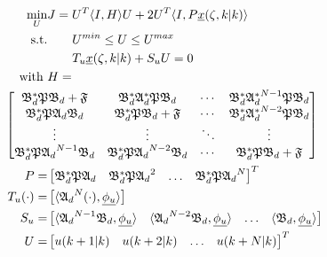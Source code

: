 \begin{equation} \label{eq:MPC_QP}
    \begin{aligned}
        \min_{U} &J = U^T \langle I,H \rangle U + 2U^T \langle I, P \underline{x}(\zeta, k|k) \rangle \\
        \text{s.t.} &\qquad U^{min} \leq U \leq U^{max} \\
        &\qquad T_u \underline{x}(\zeta, k|k) + S_u U = 0
        \, \\
        \text{with } &H = \\
        &\hspace{-3.5em }\begin{bmatrix}
            \mathfrak{B}_d^* \mathfrak{P} \mathfrak{B}_d + \mathfrak{F} & \mathfrak{B}_d^* \mathfrak{A}_d^* \mathfrak{P} \mathfrak{B}_d & \cdots &  \mathfrak{B}_d^* {\mathfrak{A}_d^*}^{N-1} \mathfrak{P} \mathfrak{B}_d \\
            \mathfrak{B}_d^* \mathfrak{P} \mathfrak{A}_d \mathfrak{B}_d & \mathfrak{B}_d^* \mathfrak{P} \mathfrak{B}_d + \mathfrak{F} & \cdots & \mathfrak{B}_d^* {\mathfrak{A}_d^*}^{N-2} \mathfrak{P} \mathfrak{B}_d \\
            \vdots & \vdots & \ddots & \vdots \\
            \mathfrak{B}_d^* \mathfrak{P} {\mathfrak{A}_d}^{N-1} \mathfrak{B}_d & \mathfrak{B}_d^* \mathfrak{P} {\mathfrak{A}_d}^{N-2} \mathfrak{B}_d & \cdots & \mathfrak{B}_d^* \mathfrak{P} \mathfrak{B}_d + \mathfrak{F}
        \end{bmatrix} \\
        P = &\begin{bmatrix}
            \mathfrak{B}_d^* \mathfrak{P} {\mathfrak{A}_d} &
            \mathfrak{B}_d^* \mathfrak{P} {\mathfrak{A}_d}^{2}  &
            \hdots &
            \mathfrak{B}_d^* \mathfrak{P} {\mathfrak{A}_d}^{N} 
        \end{bmatrix}^T \\
        T_u (\cdot) = &\begin{bmatrix}
            \langle {\mathfrak{A}_d}^{N} (\cdot), \underline{\phi_u} \rangle
        \end{bmatrix} \\
        S_u = &\begin{bmatrix}
            \langle {\mathfrak{A}_d}^{N-1} \mathfrak{B}_d, \underline{\phi_u} \rangle & 
            \langle {\mathfrak{A}_d}^{N-2} \mathfrak{B}_d, \underline{\phi_u} \rangle &
            \hdots &
            \langle \mathfrak{B}_d, \underline{\phi_u} \rangle
        \end{bmatrix} \\
        U = &\begin{bmatrix}
            u(k+1|k) & u(k+2|k) & \hdots & u(k+N|k)
        \end{bmatrix}^T
    \end{aligned}
\end{equation}